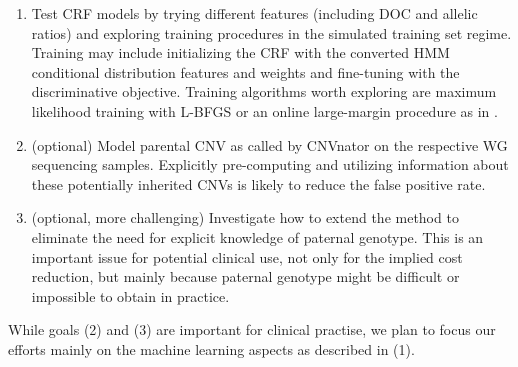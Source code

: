 \documentclass[11pt]{article}
\begin{document}
\begin{enumerate}

\item Test CRF models by trying different features (including DOC and allelic ratios) and exploring training procedures in the simulated training set regime. Training may include initializing the CRF with the converted HMM conditional distribution features and weights and fine-tuning with the discriminative objective. Training algorithms worth exploring are maximum likelihood training with L-BFGS or an online large-margin procedure as in \cite{bernal2007}.

\item (optional) Model parental CNV as called by CNVnator on the respective WG sequencing samples. Explicitly pre-computing and utilizing information about these potentially inherited CNVs is likely to reduce the false positive rate.

\item (optional, more challenging) Investigate how to extend the method to eliminate the need for explicit knowledge of paternal genotype. This is an important issue for potential clinical use, not only for the implied cost reduction, but mainly because paternal genotype might be difficult or impossible to obtain in practice.

\end{enumerate}
While goals (2) and (3) are important for clinical practise, we plan to focus our efforts mainly on the machine learning aspects as described in (1).




 
\end{document}
